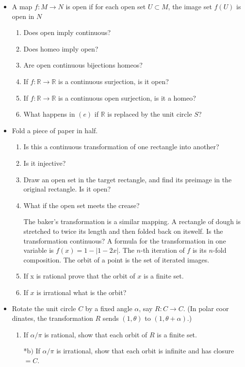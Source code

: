 \documentclass[11pt,a4paper]{article}
\newcommand{\pnum}[1]{\item[\textbf{#1}]}
\newcommand{\R}{\mathbb{R}}
\begin{document}
\begin{itemize}
	\pnum{2.34} A map $f : M \to N$ is open if for each open set $U \subset M$, the image set $f(U)$
	is open in $N$
	\begin{enumerate}[label=\alph*)]
		\item Does open imply continuous?
		\item Does homeo imply open?
		\item Are open continuous bijections homeos?
		\item If $f : \R \to \R$ is a continuous surjection, is it open?
		\item If $f : \R \to \R$ is a continuous open surjection, is it a homeo?
		\item What happens in $(e)$ if $\R$ is replaced by the unit circle $S$?
	\end{enumerate}

	\pnum{2.35} Fold a piece of paper in half.
	\begin{enumerate}[label=\alph*)]
		\item Is this a continuous transformation of one rectangle into another?
		\item Is it injective?
		\item Draw an open set in the target rectangle, and find its preimage in the original rectangle.
			Is it open?
		\item What if the open set meets the crease?
		
			The baker's transformation is a similar mapping. A rectangle of dough is stretched to twice its
			length and then folded back on itswelf. Is the transformation continuous? A formula for the
			transformation in one variable is $f(x) = 1 - |1-2x|$. The $n$-th iteration of $f$ is its $n$-fold
			composition. The orbit of a point is the set of iterated images.
		\item If x is rational prove that the orbit of $x$ is a finite set.
		\item If $x$ is irrational what is the orbit?
	\end{enumerate}

	\pnum{2.36} Rotate the unit circle $C$ by a fixed angle $\alpha$, say $R : C \to C$. (In polar coor
	dinates, the transformation $R$ sends $(1,\theta)$ to $(1,\theta + \alpha)$.)
	\begin{enumerate}[label=\alph*)]
		\item If $\alpha/\pi$ is rational, show that each orbit of $R$ is a finite set.
		\item[*b$)$] If $\alpha / \pi$ is irrational, show that each orbit is infinite and has closure $=C$.
	\end{enumerate}


\end{itemize}
\end{document}
